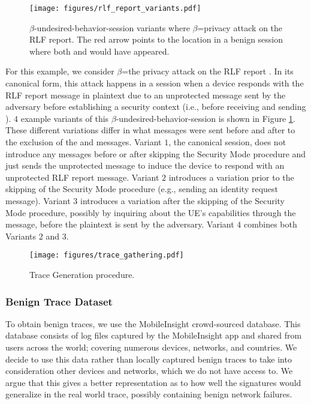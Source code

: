 \begin{figure}[t]
	\centering
	  \texttt{[image: figures/rlf\_report\_variants.pdf]}
	  \caption{$\beta$-undesired-behavior-session variants where $\beta$=privacy attack on the RLF report. The red arrow points to the location
	in a benign session where  both \securityModeCommand and \securityModeComplete
	would have appeared.}
	  \label{fig:measurement_report}
  \end{figure}


\begin{example}[$\beta$-undesired-behavior-session variants]
	For this example, we consider $\beta$=the privacy attack on the RLF report \cite{privacy_ndss16}.
	In its canonical form, this attack happens in a session when a device responds with the RLF report message in plaintext
	due to an unprotected \ueInformationRequest message sent by the adversary before establishing a
	security context (i.e., before receiving \securityModeCommand and sending \securityModeComplete).
	$4$ example variants of this $\beta$-undesired-behavior-session is shown in Figure \ref{fig:measurement_report}.
 These different variations differ in what messages were sent before and after to the exclusion
of the \securityModeCommand and \securityModeComplete
messages.   Variant $1$, the canonical session,
does not introduce any messages before or after skipping the Security Mode
procedure and just sends the unprotected \ueInformationRequest message to induce the device to respond with an
unprotected RLF report message. Variant $2$ introduces a variation prior to the skipping of the Security
Mode procedure (e.g., sending an identity request message). Variant $3$ introduces a variation after
the skipping of the Security Mode procedure, possibly by inquiring about the UE’s capabilities through
the \ueCapabilityEnquiry message, before the plaintext \ueInformationRequest is sent by the adversary.
Variant $4$ combines both Variants $2$ and $3$.
\end{example}


\begin{figure}[t]
  \centering
	\texttt{[image: figures/trace\_gathering.pdf]}
	\caption{Trace Generation procedure.}
	\label{fig:trace_gathering}
\end{figure}

\subsubsection{Benign Trace Dataset}
To obtain benign traces, we use the MobileInsight \cite{mobile_insight}
crowd-sourced database. This database consists of log files captured by the
MobileInsight app and shared from users across the world; covering numerous
devices, networks, and countries. We decide to use this data rather than locally
captured benign traces to take into consideration other devices and networks,
which we do not have access to. We argue that this gives a better representation
as to how well the signatures would generalize in the real world trace, possibly
containing benign network failures.

